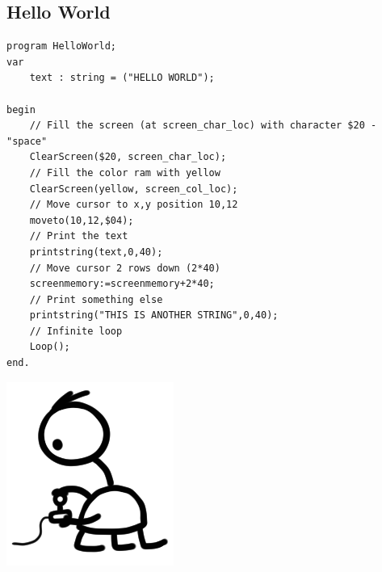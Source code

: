 \subsection{Hello World}
\begin{minipage}{0.8\textwidth}
\begin{lstlisting}
program HelloWorld;
var  
  	text : string = ("HELLO WORLD");

begin
	// Fill the screen (at screen_char_loc) with character $20 - "space"
	ClearScreen($20, screen_char_loc);
	// Fill the color ram with yellow
	ClearScreen(yellow, screen_col_loc);
	// Move cursor to x,y position 10,12
	moveto(10,12,$04);
	// Print the text
	printstring(text,0,40);
	// Move cursor 2 rows down (2*40)
	screenmemory:=screenmemory+2*40;
	// Print something else
	printstring("THIS IS ANOTHER STRING",0,40);
	// Infinite loop
	Loop(); 
end.
\end{lstlisting}
\end{minipage}
\begin{minipage}{0.2\textwidth}
\includegraphics[width=\linewidth]{images/trip/trip8.png}
\end{minipage}


